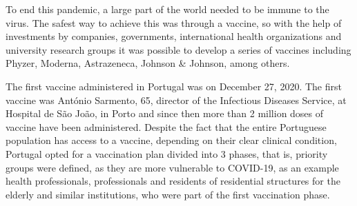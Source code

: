 
   To end this pandemic, a large part of the world needed to be immune to the virus. The safest way to achieve this was through a vaccine, so with the help of investments by companies, governments, international health organizations and university research groups it was possible to develop a series of vaccines including Phyzer, Moderna, Astrazeneca, Johnson & Johnson, among others.

   The first vaccine administered in Portugal was on December 27, 2020. The first vaccine was António Sarmento, 65, director of the Infectious Diseases Service, at Hospital de São João, in Porto and since then more than 2 million doses of vaccine have been administered. Despite the fact that the entire Portuguese population has access to a vaccine, depending on their clear clinical condition, Portugal opted for a vaccination plan divided into 3 phases, that is, priority groups were defined, as they are more vulnerable to COVID-19, as an example health professionals, professionals and residents of residential structures for the elderly and similar institutions, who were part of the first vaccination phase.
